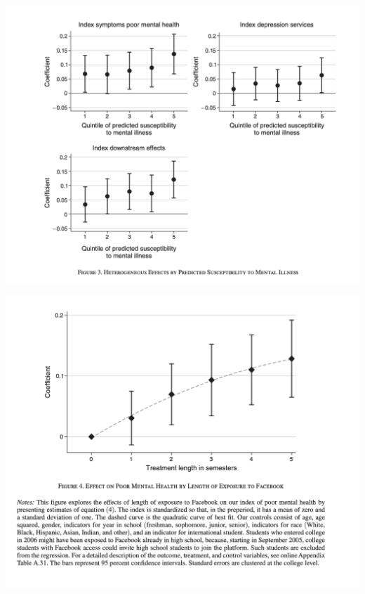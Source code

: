 \documentclass{beamer}
\begin{document}
\begin{frame}
\begin{center}
\includegraphics[scale=0.35]{./lecture_includes/facebook_4}
\end{center}
\end{frame}

\begin{frame}
\begin{center}
\includegraphics[scale=0.35]{./lecture_includes/facebook_5}
\end{center}
\end{frame}
\end{document}
